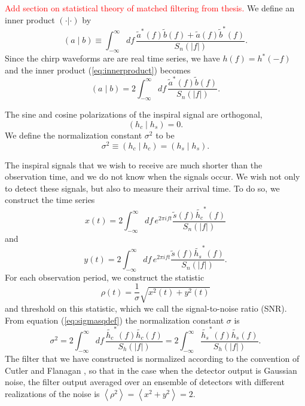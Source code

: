 \textcolor{red}{Add section on statistical theory of matched filtering from
thesis.} We define an inner product $(\cdot|\cdot)$ by
\begin{equation}
\label{eq:innerproduct}
  (a\mid b) \equiv \int_{-\infty}^\infty df\,
  \frac{\tilde{a}^\ast(f)\tilde{b}(f)+\tilde{a}(f)\tilde{b}^\ast(f)}
       {S_n(|f|)}.
\end{equation}
Since the chirp waveforms are are real time series, we have $h(f) =
h^\ast(-f)$ and the inner product (\ref{eq:innerproduct}) becomes
\begin{equation}
\left(a\mid b\right) = 2 \int_{-\infty}^{\infty}df\,
\frac{\tilde{a}^\ast(f)\tilde{b}(f)}{S_n\left(\left|f\right|\right)}.
\label{eq:innerproduct2}
\end{equation}

The sine and cosine polarizations of the inspiral signal are orthogonal,
\begin{equation}
\left(h_c\mid h_s\right) = 0.
\end{equation}
We define the normalization constant $\sigma^2$ to be
\begin{equation}
\sigma^2 \equiv \left(h_c\mid h_c\right) = \left(h_s\mid h_s\right).
\label{eq:sigmasqdef}
\end{equation}

The inspiral signals that we wish to receive are much shorter than the
observation time, and we do not know when the signals occur. We wish not only
to detect these signals, but also to measure their arrival time. To do so, we
construct the time series
\begin{equation}
\label{eq:xcts}
x(t) = 2 \int_{-\infty}^{\infty}df\,e^{2\pi i f t} 
\frac{\tilde{s}(f) \tilde{h_c}^\ast(f)}{S_n\left(\left|f\right|\right)}
\end{equation}
and
\begin{equation}
\label{eq:ycts}
y(t) = 2 \int_{-\infty}^{\infty}df\,e^{2\pi i f t} 
\frac{\tilde{s}(f) \tilde{h_s}^\ast(f)}{S_n\left(\left|f\right|\right)}.
\end{equation}
For each observation period, we construct the statistic
\begin{equation}
\rho(t) = \frac{1}{\sigma}\sqrt{x^2(t) + y^2(t)}
\label{eq:rhosqcts}
\end{equation}
and threshold on this statistic, which we call the signal-to-noise ratio
(SNR). From equation (\ref{eq:sigmasqdef}) the normalization constant $\sigma$ is
\begin{equation}
\label{eq:sigmasqcts}
\sigma^2 = 2 \int_{-\infty}^{\infty}df\,
\frac{\tilde{h_c}^\ast(f)\tilde{h_c}(f)}{S_h\left(\left|f\right|\right)} 
= 2 \int_{-\infty}^\infty 
\frac{\tilde{h_s}^\ast(f)\tilde{h_s}(f)}{S_h\left(\left|f\right|\right)}.
\end{equation}
The filter that we have constructed is normalized according to the convention
of Cutler and Flanagan \cite{cutflan}, so that in the case when the detector
output is Gaussian noise, the filter output averaged over an ensemble of
detectors with different realizations of the noise is
$\left\langle \rho^2 \right\rangle = \left\langle x^2 + y^2 \right\rangle = 2$.

